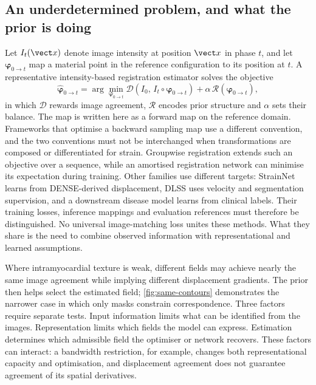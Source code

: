 \subsection{An underdetermined problem, and what the prior is doing}\label{sec:illposed}

Let \(I_t(\vect x)\) denote image intensity at position \(\vect x\) in phase \(t\), and let \(\boldsymbol\varphi_{0\rightarrow t}\) map a material point in the reference configuration to its position at \(t\). A representative intensity-based registration estimator solves the objective
\begin{equation}
\widehat{\boldsymbol\varphi}_{0\rightarrow t}
=\arg\min_{\boldsymbol\varphi_{0\rightarrow t}}
\mathcal D\!\left(I_0,\,I_t\circ\boldsymbol\varphi_{0\rightarrow t}\right)
+\alpha\,\mathcal R(\boldsymbol\varphi_{0\rightarrow t}),
\label{eq:registration}
\end{equation}
in which \(\mathcal D\) rewards image agreement, \(\mathcal R\) encodes prior structure and \(\alpha\) sets their balance. The map is written here as a forward map on the reference domain. Frameworks that optimise a backward sampling map use a different convention, and the two conventions must not be interchanged when transformations are composed or differentiated for strain. Groupwise registration extends such an objective over a sequence, while an amortised registration network can minimise its expectation during training. Other families use different targets: StrainNet learns from DENSE-derived displacement, DLSS uses velocity and segmentation supervision, and a downstream disease model learns from clinical labels. Their training losses, inference mappings and evaluation references must therefore be distinguished. No universal image-matching loss unites these methods. What they share is the need to combine observed information with representational and learned assumptions.

Where intramyocardial texture is weak, different fields may achieve nearly the same image agreement while implying different displacement gradients. The prior then helps select the estimated field; \cref{fig:same-contours} demonstrates the narrower case in which only masks constrain correspondence. Three factors require separate tests. Input information limits what can be identified from the images. Representation limits which fields the model can express. Estimation determines which admissible field the optimiser or network recovers. These factors can interact: a bandwidth restriction, for example, changes both representational capacity and optimisation, and displacement agreement does not guarantee agreement of its spatial derivatives.


